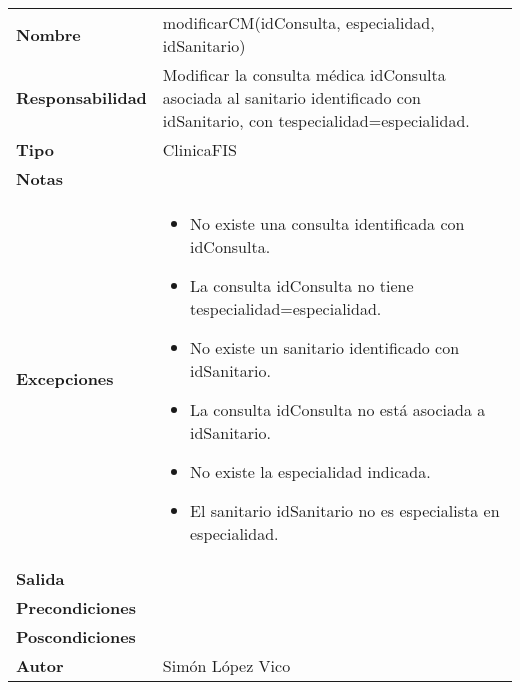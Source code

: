 \documentclass[11pt,a4paper]{article}
\newenvironment{itemizenomargins}
    {\begin{minipage}[t]{1\linewidth}\begin{itemize}}
    {\end{itemize}\end{minipage}}
\begin{document}
\begin{table}[H]
	\centering
	\label{my-label}
	\begin{tabularx}{\textwidth}{l|X}
		\textbf{Nombre}          & modificarCM(idConsulta, especialidad, idSanitario) \\
		\textbf{Responsabilidad} & Modificar la consulta médica idConsulta asociada al sanitario identificado con idSanitario, con tespecialidad=especialidad. \\
		\textbf{Tipo}            & ClinicaFIS \\
		\textbf{Notas}           &  \\
		\textbf{Excepciones}     &
		\begin{itemizenomargins}
			\item No existe una consulta identificada con idConsulta.
			\item La consulta idConsulta no tiene tespecialidad=especialidad.
			\item No existe un sanitario identificado con idSanitario. 
			\item La consulta idConsulta no está asociada a idSanitario.
			\item No existe la especialidad indicada.
			\item El sanitario idSanitario no es especialista en especialidad.
		\end{itemizenomargins} \\
		\textbf{Salida}          &  \\
		\textbf{Precondiciones}  &  \\
		\textbf{Poscondiciones}  &  \\
		\textbf{Autor}			 & Simón López Vico
	\end{tabularx}
\end{table}
\end{document}
